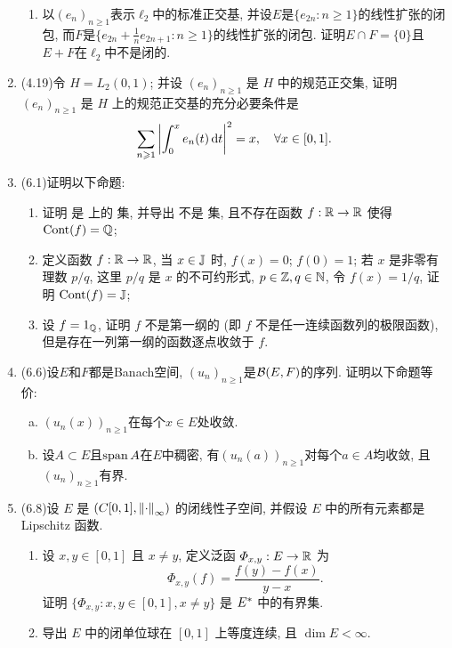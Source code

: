 \begin{enumerate}[label=\textbf{\arabic*.}, ref=\arabic*]
\begin{enumerate}[(1)]
		\item 以$ (e_n)_{n\geqslant 1} $表示$ \ell_2 $中的标准正交基, 并设$ E $是$ \{ e_{2n} : n\geqslant 1 \} $的线性扩张的闭包, 而$ F $是$ \{ e_{2n}+\frac{1}{n}e_{2n+1} : n\geqslant 1 \} $的线性扩张的闭包. 证明$ E\cap F=\{0\} $且$ E+F $在$ \ell_2 $中不是闭的. 
		\end{enumerate}
	\item (4.19)令 $ H=L_{2}(0, 1) $; 并设 $ (e_{n})_{n\geqslant1} $ 是 $ H $ 中的规范正交集, 证明 $ (e_{n})_{n\geqslant1} $ 是 $ H $ 上的规范正交基的充分必要条件是 
		\[
			\sum_{n\geqslant1}\left| \int_{0}^{x}e_{n}(t)\,\mathrm{d} t \right| ^{2} = x, \quad \forall x\in[0, 1].
		\]
	\item (6.1)证明以下命题:
		\begin{enumerate}[(1)]
			\item 证明 \J 是 \R 上的 \Gd 集, 并导出 \Q 不是 \Gd 集, 且不存在函数 $ f:\mathbb{R}\to\mathbb{R} $ 使得 $ \operatorname{Cont}(f)=\mathbb{Q} $;
			\item 定义函数 $ f:\mathbb{R}\to\mathbb{R} $, 当 $ x\in\mathbb{J} $ 时, $ f(x)=0 $; $ f(0)=1 $; 若 $ x $ 是非零有理数 $ p/q $, 这里 $ p/q $ 是 $ x $ 的不可约形式, $ p\in\mathbb{Z}, q\in\mathbb{N} $, 令 $ f(x)=1/q $, 证明 $ \operatorname{Cont}(f)=\mathbb{J} $;
			\item 设 $ f=1_{\mathbb{Q}} $, 证明 $ f $ 不是第一纲的 (即 $ f $ 不是任一连续函数列的极限函数), 但是存在一列第一纲的函数逐点收敛于 $ f $. 
		\end{enumerate}
	\item (6.6)设$ E $和$ F $都是Banach空间, $ (u_n)_{n\geqslant 1} $是$ \mathcal{B}(E,F) $的序列. 证明以下命题等价:
		\begin{enumerate}[(a)]
		\item $ (u_n(x))_{n\geqslant 1} $在每个$ x\in E $处收敛.
		\item 设$ A\subset E $且$ \operatorname{span} A $在$ E $中稠密, 有$ (u_n(a))_{n\geqslant 1} $对每个$ a\in A $均收敛, 且$ (u_n)_{n\geqslant 1} $有界. 
		\end{enumerate}
	\item (6.8)设 $ E $ 是 $ (C[0, 1], \left\| \cdot \right\|_{\infty}) $ 的闭线性子空间, 并假设 $ E $ 中的所有元素都是 Lipschitz 函数.
		\begin{enumerate}[(1)]
			\item 设 $ x, y\in[0, 1] $ 且 $ x\ne y $, 定义泛函 $ \varPhi_{x, y}:E\to\mathbb{R} $ 为
			\[
				\varPhi_{x, y}(f)=\frac{f(y)-f(x)}{y-x}.
			\]
			证明 $\{ \varPhi_{x, y}:x, y\in[0, 1], x\ne y \}$ 是 $ E^{*} $ 中的有界集.
			\item 导出 $ E $ 中的闭单位球在 $ [0, 1] $ 上等度连续, 且 $ \dim E<\infty $. 
		\end{enumerate}

\end{enumerate}
